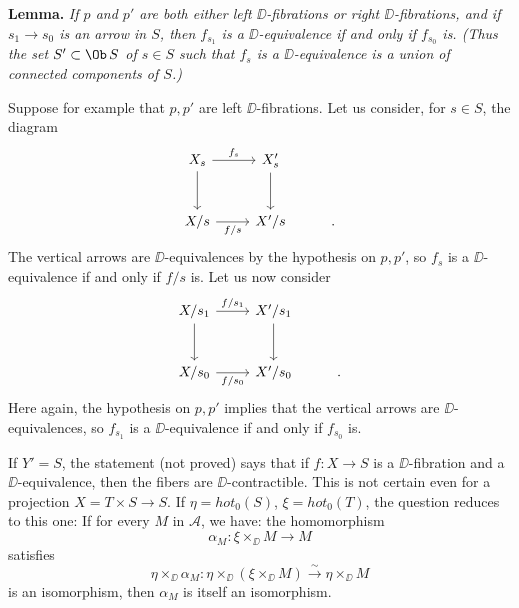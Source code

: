 \textbf{Lemma.} \textit{If $p$ and $p'$ are both either left $\DD$-fibrations or right $\DD$-fibrations, and if $s_1 \to s_0$ is an arrow in $S$, then $f_{s_1}$ is a $\DD$-equivalence if and only if $f_{s_0}$ is. (Thus the set $S' \subset \Ob\, S$ of $s \in S$ such that $f_s$ is a $\DD$-equivalence is a union of connected components of $S$.)}

\indent Suppose for example that $p,p'$ are left $\DD$-fibrations. Let us consider, for $s \in S$, the diagram
\[
\begin{tikzcd}[row sep=large]
X_s \arrow[r, "f_s"] \arrow[d] & X'_s \arrow[d] \\
X/s \arrow[r, "f/s"'] & X'/s & .
\end{tikzcd}
\]
The vertical arrows are $\DD$-equivalences by the hypothesis on $p,p'$, so $f_s$ is a $\DD$-equivalence if and only if $f/s$ is. Let us now consider
\[
\begin{tikzcd}[row sep=large]
X/s_1 \arrow[r, "f/s_1"] \arrow[d] & X'/s_1 \arrow[d] \\
X/s_0 \arrow[r, "f/s_0"'] & X'/s_0 & .
\end{tikzcd}
\]
Here again, the hypothesis on $p,p'$ implies that the vertical arrows are $\DD$-equivalences, so $f_{s_1}$ is a $\DD$-equivalence if and only if $f_{s_0}$ is.


If $Y' = S$, the statement (not proved) says that if $f : X \to S$ is a $\DD$-fibration and a $\DD$-equivalence, then the fibers are $\DD$-contractible. This is not certain even for a projection $X = T \times S \to S$. If $\eta = \mathit{hot}_0(S)$, $\xi = \mathit{hot}_0(T)$, the question reduces to this one: If for every $M$ in $\mathcal{A}$, we have: the homomorphism
\[
\alpha_M : \xi \times_{\DD} M \longrightarrow M
\]
satisfies
\[
\eta \times_{\DD} \alpha_M : \eta \times_{\DD} (\xi \times_{\DD} M) \xrightarrow{\sim} \eta \times_{\DD} M
\]
is an isomorphism, then $\alpha_M$ is itself an isomorphism.


